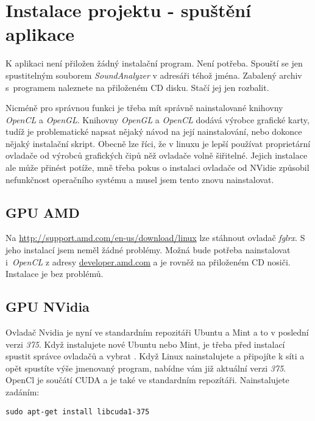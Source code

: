 \chapter{Instalace projektu - spuštění aplikace}
\label{kap:instalaceprogramu}

K aplikaci není přiložen žádný instalační program. Není potřeba. Spouští se jen spustitelným souborem \emph{SoundAnalyzer} v adresáři téhož jména. Zabalený archiv s~programem naleznete na přiloženém CD disku. Stačí jej jen rozbalit.


Nicméně pro správnou funkci je třeba mít správně nainstalované knihovny \emph{OpenCL} a \emph{OpenGL}. Knihovny \emph{OpenGL} a \emph{OpenCL} dodává výrobce grafické karty, tudíž je problematické napsat nějaký návod na její nainstalování, nebo dokonce nějaký instalační skript. Obecně lze říci, že v linuxu je lepší používat proprietární ovladače od výrobců grafických čipů něž ovladače volně šiřitelné. Jejich instalace ale může přinést potíže, mně třeba pokus o instalaci ovladače od NVidie způsobil nefunkčnost operačního systému a musel jsem tento znovu nainstalovat.

\section{GPU AMD}

Na \url{http://support.amd.com/en-us/download/linux} lze stáhnout ovladač \emph{fglrx}. S jeho instalací jsem neměl žádné problémy. Možná bude potřeba nainstalovat i~\emph{OpenCL} z adresy \href{http://developer.amd.com/tools-and-sdks/opencl-zone/amd-accelerated-parallel-processing-app-sdk/}{developer.amd.com} a je rovněž na přiloženém CD nosiči. Instalace je bez problémů.

\section{GPU NVidia}

Ovladač Nvidia je nyní ve standardním repozitáři Ubuntu a Mint a to v poslední verzi \emph{375}. Když instalujete nové Ubuntu nebo Mint, je třeba před instalací spustit správce ovladačů a vybrat . Když Linux nainstalujete a připojíte k síti a opět spustíte výše jmenovaný program, nabídne vám již aktuální verzi \emph{375}. OpenCl je součátí CUDA a je také ve standardním repozítáři.
Nainstalujete zadáním:

\begin{Verbatim} 
sudo apt-get install libcuda1-375
\end{Verbatim}

